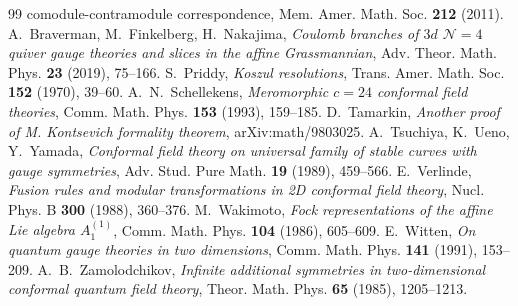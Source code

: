 \documentclass[11pt]{amsart}
\numberwithin{equation}{section}
\theoremstyle{plain}
\theoremstyle{definition}
\theoremstyle{remark}
\begin{document}
\begin{thebibliography}{99}
{comodule-contramodule correspondence},
Mem. Amer. Math. Soc. \textbf{212} (2011).
 A.~Braverman, M.~Finkelberg, H.~Nakajima,
\emph{Coulomb branches of $3d$ $\mathcal{N}=4$ quiver gauge theories
and slices in the affine Grassmannian},
Adv. Theor. Math. Phys. \textbf{23} (2019), 75--166.
 S.~Priddy,
\emph{Koszul resolutions},
Trans. Amer. Math. Soc. \textbf{152} (1970), 39--60.
 A.~N.~Schellekens,
\emph{Meromorphic $c=24$ conformal field theories},
Comm. Math. Phys. \textbf{153} (1993), 159--185.
 D.~Tamarkin,
\emph{Another proof of M. Kontsevich formality theorem},
arXiv:math/9803025.
 A.~Tsuchiya, K.~Ueno, Y.~Yamada,
\emph{Conformal field theory on universal family of stable curves
with gauge symmetries},
Adv. Stud. Pure Math. \textbf{19} (1989), 459--566.
 E.~Verlinde,
\emph{Fusion rules and modular transformations in 2D conformal field
theory},
Nucl. Phys. B \textbf{300} (1988), 360--376.
 M.~Wakimoto,
\emph{Fock representations of the affine Lie algebra
$A^{(1)}_1$},
Comm. Math. Phys. \textbf{104} (1986), 605--609.
 E.~Witten,
\emph{On quantum gauge theories in two dimensions},
Comm. Math. Phys. \textbf{141} (1991), 153--209.
 A.~B.~Zamolodchikov,
\emph{Infinite additional symmetries in two-dimensional conformal
quantum field theory},
Theor. Math. Phys. \textbf{65} (1985), 1205--1213.
\end{thebibliography}
\end{document}
